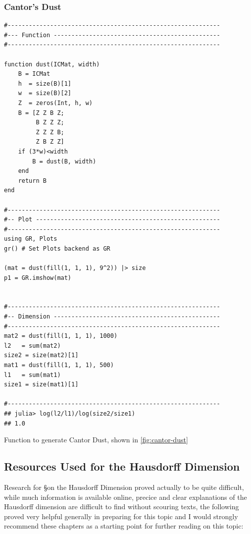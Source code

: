 \documentclass[a4paper,11pt,twoside]{article}
\begin{document}
\subsubsection{Cantor's Dust}
\label{sec:orgbe0d3db}

\begin{listing}[htbp]
\begin{verbatim}
#------------------------------------------------------------
#--- Function -----------------------------------------------
#------------------------------------------------------------

function dust(ICMat, width)
    B = ICMat
    h  = size(B)[1]
    w  = size(B)[2]
    Z  = zeros(Int, h, w)
    B = [Z Z B Z;
         B Z Z Z;
         Z Z Z B;
         Z B Z Z]
    if (3*w)<width
        B = dust(B, width)
    end
    return B
end

#------------------------------------------------------------
#-- Plot ----------------------------------------------------
#------------------------------------------------------------
using GR, Plots
gr() # Set Plots backend as GR

(mat = dust(fill(1, 1, 1), 9^2)) |> size
p1 = GR.imshow(mat)


#------------------------------------------------------------
#-- Dimension -----------------------------------------------
#------------------------------------------------------------
mat2 = dust(fill(1, 1, 1), 1000)
l2   = sum(mat2)
size2 = size(mat2)[1]
mat1 = dust(fill(1, 1, 1), 500)
l1   = sum(mat1)
size1 = size(mat1)[1]

#------------------------------------------------------------
## julia> log(l2/l1)/log(size2/size1)
## 1.0

\end{verbatim}
\caption{\label{l-cant-dust}Function to generate Cantor Dust, shown in \ref{fig:cantor-dust}}
\end{listing}

\subsection{Resources Used for the Hausdorff Dimension}
\label{haus-resource}
Research for \S on the Hausdorff Dimension proved actually to be quite difficult, while much information is available online, precice and clear explanations of the Hausdorff dimension are difficult to find without scouring texts, the following proved very helpful generally in preparing for this topic and I would strongly recommend these chapters as a starting point for further reading on this topic:
\end{document}
